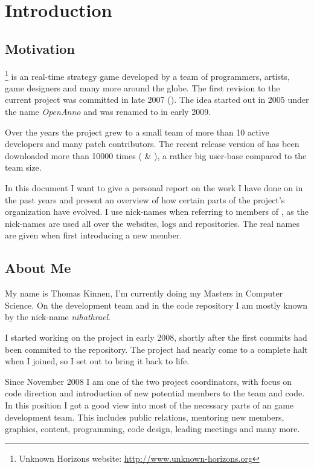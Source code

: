 

\section{Introduction}

\subsection{Motivation}
\UH{}\footnote{Unknown Horizons website: \url{http://www.unknown-horizons.org}} is an \OS{} real-time strategy game developed by a team of programmers, artists, game
designers and many more around the globe. The first revision to the current project was committed in late 2007 (\cite{githubuhcommit}). The idea
started out in 2005 under the name \textit{OpenAnno} and was renamed to \UH{} in early 2009.

Over the years the project grew to a small team of more than 10 active developers and many
patch contributors. The recent release version of \UH{} has been downloaded more than 10000 times (\cite{sourceforge} \& \cite{chipde11}), a rather
big user-base compared to the team size.

In this document I want to give a personal report on the work I have done on \UH{} in the past years and present an
overview of how certain parts of the project's organization have evolved. I use nick-names when referring to members of
\UH{}, as the nick-names are used all over the websites, logs and repositories. The real names are given when first
introducing a new member.

\subsection{About Me}
My name is Thomas Kinnen, I'm currently doing my Masters in Computer Science. On the development team and in the code
repository I am mostly known by the nick-name \textit{nihathrael}.

I started working on the project in early 2008, shortly after the first commits had been commited to the repository. 
The project had nearly come to a complete halt when I joined, so I set out to bring it back to life.

Since November 2008 I am one of the two project coordinators, with focus on code direction and introduction of new
potential members to the team and code. In this position I got a good view into most of the necessary parts of an \OS{}
game development team. This includes public relations, mentoring new members, graphics, content, programming, code
design, leading meetings and many more.

